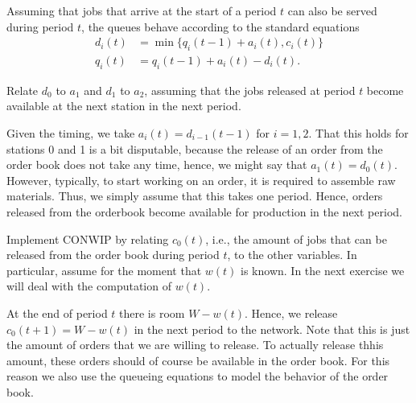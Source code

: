 \documentclass{scrartcl}
\begin{document}
Assuming that jobs that arrive at the start of a period $t$ can also be served during period $t$, the queues behave according to the standard equations
\begin{align*}
  d_i(t) &= \min\{q_i(t-1) + a_i(t), c_i(t)\} \\
  q_i(t) &= q_i(t-1) + a_i(t) - d_i(t).
\end{align*}


\begin{exercise} Relate $d_0$ to $a_1$ and $d_1$ to $a_2$, assuming that the jobs released at period $t$ become available at the next station in the next period.
  \begin{solution}
    Given the timing, we take $a_i(t) = d_{i-1}(t-1)$ for $i=1,2$.
    That this holds for stations 0 and 1 is a bit disputable, because the release of an order from the order book does not take any time, hence, we might say that $a_1(t) = d_0(t)$.
    However, typically, to start working on an order, it is required to assemble raw materials.
    Thus, we simply assume that this takes one period.
    Hence, orders released from the orderbook become available for production in the next period.
  \end{solution}
\end{exercise}

\begin{exercise}
  Implement CONWIP by relating $c_0(t)$, i.e., the amount of jobs that can be released from the order book during period $t$, to the other variables.
  In particular, assume for the moment that $w(t)$ is known.
  In the next exercise we will deal with the computation of $w(t)$.
  \begin{solution}
    At the end of period $t$ there is room $W-w(t)$.
    Hence, we release $c_0(t+1) = W-w(t)$ in the next period to the network.
    Note that this is just the amount of orders that we are willing to release.
    To actually release thhis amount, these orders should of course be available in the order book.
    For this reason we also use the queueing equations to model the behavior of the order book.
  \end{solution}
\end{exercise}
\end{document}
